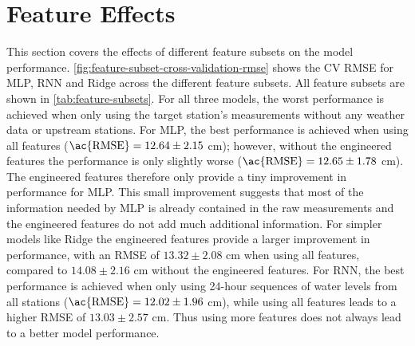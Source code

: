\section{Feature Effects}
This section covers the effects of different feature subsets on the model performance. \autoref{fig:feature-subset-cross-validation-rmse} shows the \ac{CV} \ac{RMSE} for \ac{MLP}, \ac{RNN} and Ridge across the different feature subsets. All feature subsets are shown in \autoref{tab:feature-subsets}. For all three models, the worst performance is achieved when only using the target station's measurements without any weather data or upstream stations. For \ac{MLP}, the best performance is achieved when using all features ($\text{\ac{RMSE}} = 12.64 \pm 2.15$ cm); however, without the engineered features the performance is only slightly worse ($\text{\ac{RMSE}} = 12.65 \pm 1.78$ cm). The engineered features therefore only provide a tiny improvement in performance for \ac{MLP}. This small improvement suggests that most of the information needed by \ac{MLP} is already contained in the raw measurements and the engineered features do not add much additional information. For simpler models like Ridge the engineered features provide a larger improvement in performance, with an \ac{RMSE} of $13.32 \pm 2.08$ cm when using all features, compared to $14.08 \pm 2.16$ cm without the engineered features. For \ac{RNN}, the best performance is achieved when only using 24-hour sequences of water levels from all stations ($\text{\ac{RMSE}} = 12.02 \pm 1.96$ cm), while using all features leads to a higher \ac{RMSE} of $13.03 \pm 2.57$ cm. Thus using more features does not always lead to a better model performance.



